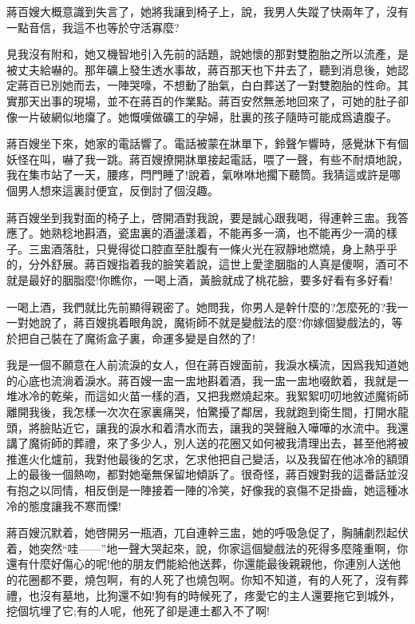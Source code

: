 \documentclass[a6paper]{article}
\begin{document}
蔣百嫂大概意識到失言了，她將我讓到椅子上，說，我男人失蹤了快兩年了，沒有一點音信，我這不也等於守活寡麼?

見我沒有附和，她又機智地引入先前的話題，說她懷的那對雙胞胎之所以流產，是被丈夫給嚇的。那年礦上發生透水事故，蔣百那天也下井去了，聽到消息後，她認定蔣百已別她而去，一陣哭嚎，不想動了胎氣，白白葬送了一對雙胞胎的性命。其實那天出事的現場，並不在蔣百的作業點。蔣百安然無恙地回來了，可她的肚子卻像一片破網似地癟了。她慨嘆做礦工的孕婦，肚裏的孩子隨時可能成爲遺腹子。

蔣百嫂坐下來，她家的電話響了。電話被蒙在牀單下，鈴聲乍響時，感覺牀下有個妖怪在叫，嚇了我一跳。蔣百嫂撩開牀單接起電話，喂了一聲，有些不耐煩地說，我在集市站了一天，腰疼，閂門睡了!說着，氣咻咻地擱下聽筒。我猜這或許是哪個男人想來這裏討便宜，反倒討了個沒趣。

蔣百嫂坐到我對面的椅子上，啓開酒對我說，要是誠心跟我喝，得連幹三盅。我答應了。她熟稔地斟酒，瓷盅裏的酒盪漾着，不能再多一滴，也不能再少一滴的樣子。三盅酒落肚，只覺得從口腔直至肚腹有一條火光在寂靜地燃燒，身上熱乎乎的，分外舒展。蔣百嫂指着我的臉笑着說，這世上愛塗胭脂的人真是傻啊，酒可不就是最好的胭脂麼!你瞧你，一喝上酒，黃臉就成了桃花臉，要多好看有多好看!

一喝上酒，我們就比先前顯得親密了。她問我，你男人是幹什麼的?怎麼死的?我一一對她說了，蔣百嫂挑着眼角說，魔術師不就是變戲法的麼?你嫁個變戲法的，等於把自己裝在了魔術盒子裏，命運多變是自然的了!

我是一個不願意在人前流淚的女人，但在蔣百嫂面前，我淚水橫流，因爲我知道她的心底也流淌着淚水。蔣百嫂一盅一盅地斟着酒，我一盅一盅地啜飲着，我就是一堆冰冷的乾柴，而這如火苗一樣的酒，又把我燃燒起來。我絮絮叨叨地敘述魔術師離開我後，我怎樣一次次在家裏痛哭，怕驚擾了鄰居，我就跑到衛生間，打開水龍頭，將臉貼近它，讓我的淚水和着清水而去，讓我的哭聲融入嘩嘩的水流中。我還講了魔術師的葬禮，來了多少人，別人送的花圈又如何被我清理出去，甚至他將被推進火化爐前，我對他最後的乞求，乞求他把自己變活，以及我留在他冰冷的額頭上的最後一個熱吻，都對她毫無保留地傾訴了。很奇怪，蔣百嫂對我的這番話並沒有抱之以同情，相反倒是一陣接着一陣的冷笑，好像我的哀傷不足掛齒，她這種冰冷的態度讓我不寒而慄!

蔣百嫂沉默着，她啓開另一瓶酒，兀自連幹三盅，她的呼吸急促了，胸脯劇烈起伏着，她突然“哇——”地一聲大哭起來，說，你家這個變戲法的死得多麼隆重啊，你還有什麼好傷心的呢!他的朋友們能給他送葬，你還能最後親親他，你連別人送他的花圈都不要，燒包啊，有的人死了也燒包啊。你知不知道，有的人死了，沒有葬禮，也沒有墓地，比狗還不如!狗有的時候死了，疼愛它的主人還要拖它到城外，挖個坑埋了它;有的人呢，他死了卻是連土都入不了啊!
\end{document}

